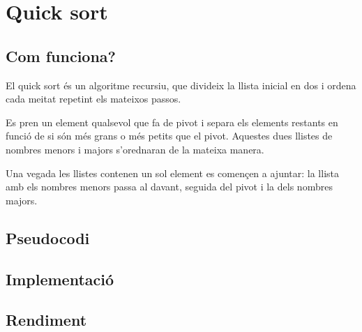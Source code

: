 \chapter{Quick sort}

\section{Com funciona?}
El quick sort és un algoritme recursiu, que divideix la llista inicial en dos i ordena cada meitat repetint els mateixos passos.

Es pren un element qualsevol que fa de pivot i separa els elements restants en funció de si són més grans o més petits que el pivot. Aquestes dues llistes de nombres menors i majors s'orednaran de la mateixa manera.

Una vegada les llistes contenen un sol element es començen a ajuntar: la llista amb els nombres menors passa al davant, seguida del pivot i la dels nombres majors.
\section{Pseudocodi}
\section{Implementació}

\section{Rendiment}
